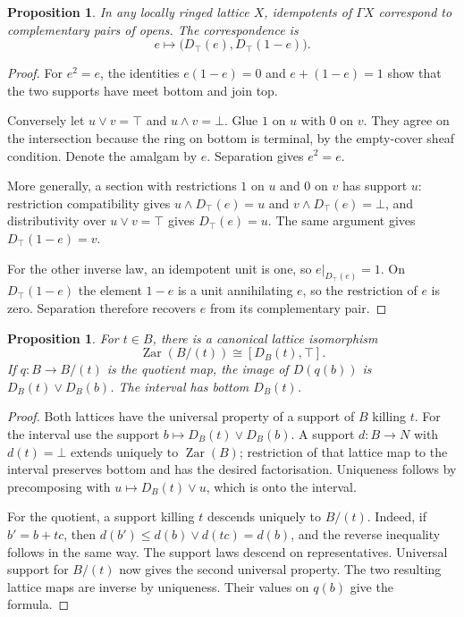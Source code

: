 \documentclass[11pt]{amsart}
\newtheorem{proposition}[theorem]{Proposition}
\theoremstyle{definition}
\theoremstyle{remark}
\newcommand{\Zar}{\operatorname{Zar}}
\newcommand{\restr}[2]{#1|_{#2}}
\begin{document}
\begin{proposition}\label{prop:idempotents}
In any locally ringed lattice $X$, idempotents of $\Gamma X$ correspond
to complementary pairs of opens. The correspondence is
\[
 e\longmapsto\bigl(D_\top(e),D_\top(1-e)\bigr).
\]
\end{proposition}
\begin{proof}
For $e^2=e$, the identities $e(1-e)=0$ and $e+(1-e)=1$ show that the
two supports have meet bottom and join top.

Conversely let $u\vee v=\top$ and $u\wedge v=\bot$. Glue $1$ on $u$
with $0$ on $v$. They agree on the intersection because the ring on
bottom is terminal, by the empty-cover sheaf condition. Denote the
amalgam by $e$. Separation gives $e^2=e$.

More generally, a section with restrictions $1$ on $u$ and $0$ on $v$
has support $u$: restriction compatibility gives
$u\wedge D_\top(e)=u$ and $v\wedge D_\top(e)=\bot$, and distributivity
over $u\vee v=\top$ gives $D_\top(e)=u$. The same argument gives
$D_\top(1-e)=v$.

For the other inverse law, an idempotent unit is one, so
$\restr{e}{D_\top(e)}=1$. On $D_\top(1-e)$ the element $1-e$ is a
unit annihilating $e$, so the restriction of $e$ is zero. Separation
therefore recovers $e$ from its complementary pair.
\end{proof}

\begin{proposition}\label{prop:quotient-lattice}
For $t\in B$, there is a canonical lattice isomorphism
\[
 \Zar(B/(t))\cong[D_B(t),\top].
\]
If $q:B\to B/(t)$ is the quotient map, the image of $D(q(b))$ is
$D_B(t)\vee D_B(b)$. The interval has bottom $D_B(t)$.
\end{proposition}
\begin{proof}
Both lattices have the universal property of a support of $B$ killing
$t$. For the interval use the support
$b\mapsto D_B(t)\vee D_B(b)$. A support $d:B\to N$ with $d(t)=\bot$
extends uniquely to $\Zar(B)$; restriction of that lattice map to the
interval preserves bottom and has the desired factorisation. Uniqueness
follows by precomposing with $u\mapsto D_B(t)\vee u$, which is onto the
interval.

For the quotient, a support killing $t$ descends uniquely to $B/(t)$.
Indeed, if $b'=b+tc$, then $d(b')\leq d(b)\vee d(tc)=d(b)$, and the
reverse inequality follows in the same way. The support laws descend
on representatives. Universal support for $B/(t)$ now gives the second
universal property. The two resulting lattice maps are inverse by
uniqueness. Their values on $q(b)$ give the formula.
\end{proof}
\end{document}
